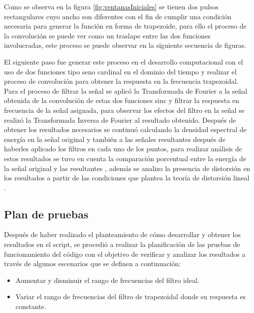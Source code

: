 Como se observa en la figura \ref{fig:ventanasIniciales} se tienen dos pulsos rectangulares cuyo ancho son diferentes con el fin de cumplir una condición necesaria para generar la función en forma de trapezoide, para ello el proceso de la convolución se puede ver como un traslape entre las dos funciones involucradas, este proceso se puede observar en la siguiente secuencia de figuras.

\vspace{-3mm}

\vspace{-9mm}

\vspace{-9mm}

\vspace{-5mm}

El siguiente paso fue generar este proceso en el desarrollo computacional con el uso de dos funciones tipo seno cardinal en el dominio del tiempo y realizar el proceso de convolución para obtener la respuesta en la frecuencia trapezoidal. Para el proceso de filtrar la señal se aplicó la Transformada de Fourier a la señal obtenida de la convolución de estas dos funciones sinc y filtrar la respuesta en frecuencia de la señal asignada, para observar los efectos del filtro en la señal se realizó la Transformada Inversa de Fourier al resultado obtenido. Después de obtener los resultados necesarios se continuó calculando la densidad espectral de energía en la señal original y también a las señales resultantes después de haberles aplicado los filtros en cada uno de los puntos, para realizar análisis de estos resultados se tuvo en cuenta la comparación porcentual entre la energía de la señal original y las resultantes \cite{densidad2021}, además se analizo la presencia de distorsión en los resultados a partir de las condiciones que plantea la teoría de distorsión lineal \cite{quiz2021}.

\subsection{Plan de pruebas}\label{planPruebas}
Después de haber realizado el planteamiento de cómo desarrollar y obtener los resultados en el script, se procedió a realizar la planificación de las pruebas de funcionamiento del código con el objetivo de verificar y analizar los resultados a través de algunos escenarios que se definen a continuación:

\begin{itemize}
	\item Aumentar y disminuir el rango de frecuencias del filtro ideal.
	\item Variar el rango de frecuencias del filtro de trapezoidal donde su respuesta es constante.
\end{itemize}

